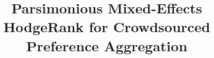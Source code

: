 \documentclass[10pt,journal,cspaper,compsoc]{IEEEtran}
\begin{document}
%
\title{Parsimonious Mixed-Effects HodgeRank for Crowdsourced Preference Aggregation}
%
%
%
%
%
%
\end{document}
